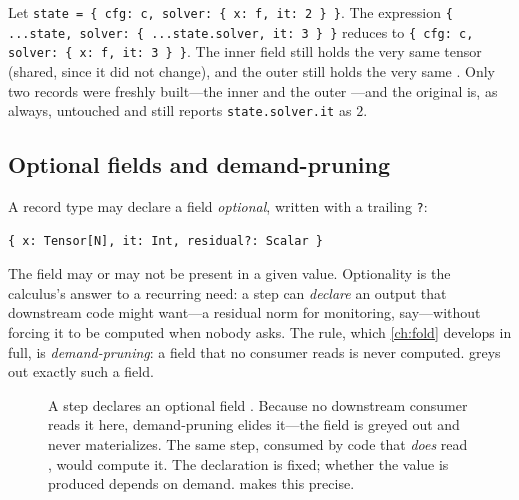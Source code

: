 \begin{example}
\label{ex:nested}
Let \lstinline[style=l4style]|state = { cfg: c, solver: { x: f, it: 2 } }|. The
expression \lstinline[style=l4style]|{ ...state, solver: { ...state.solver, it: 3 } }|
reduces to \lstinline[style=l4style]|{ cfg: c, solver: { x: f, it: 3 } }|. The
inner  field still holds the very same tensor  (shared, since it
did not change), and the outer  still holds the very same .
Only two records were freshly built---the inner  and the outer
---and the original  is, as always, untouched and still
reports \lstinline[style=l4style]|state.solver.it| as $2$.
\end{example}

\subsection{Optional fields and demand-pruning}

A record type may declare a field \emph{optional}, written with a trailing
\lstinline[style=l4style]|?|:

\begin{lstlisting}[style=l4style]
{ x: Tensor[N], it: Int, residual?: Scalar }
\end{lstlisting}

The  field may or may not be present in a given value. Optionality
is the calculus's answer to a recurring need: a step can \emph{declare} an output
that downstream code might want---a residual norm for monitoring, say---without
forcing it to be computed when nobody asks. The rule, which \cref{ch:fold}
develops in full, is \emph{demand-pruning}: a field that no consumer reads is
never computed.  greys out exactly such a field.

\begin{figure}[t]
\centering
{}
\caption[An optional, demand-pruned field]{A step declares an optional field
. Because no downstream consumer reads it here, demand-pruning
elides it---the field is greyed out and never materializes. The same step,
consumed by code that \emph{does} read , would compute it. The
declaration is fixed; whether the value is produced depends on demand.
 makes this precise.}
\label{fig:optional}
\end{figure}

